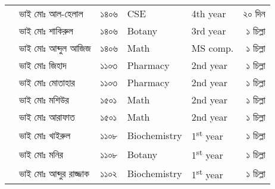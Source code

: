 \documentclass{article}
\newcounter{magicrownumbers}
\newcommand\rownumber{\stepcounter{magicrownumbers}\arabic{magicrownumbers}}
\begin{document}
\begin{tabular}{@{}lll
>{\selectlanguage{english}}l
>{\selectlanguage{english}}l
    r@{}}
\rownumber & ভাই মোঃ আল-হেলাল & ১৪০৬ & CSE & 4th year & ২০ দিন\\
\rownumber & ভাই মোঃ শাকিরুল & ১৪০৬ & Botany & 3rd year & ১ চিল্লা\\ 
\rownumber & ভাই মোঃ আব্দুল আজিজ & ১৪০৬ & Math & MS comp. & ১ চিল্লা\\  
\rownumber & ভাই মোঃ জিহাদ & ১১০৩ & Pharmacy & 2nd year & ১ চিল্লা\\ 
\rownumber & ভাই মোঃ মোতাহার & ১১০৩ & Pharmacy & 2nd year & ১ চিল্লা\\ 
\rownumber & ভাই মোঃ মশিউর & ১৫০১ & Math & 2nd year & ১ চিল্লা\\ 
\rownumber & ভাই মোঃ আরাফাত & ১৫০১ & Math & 2nd year & ১ চিল্লা\\
\rownumber & ভাই মোঃ খাইরুল & ১১০৮ & Biochemistry & 1\textsuperscript{st} year & ১ চিল্লা\\
\rownumber & ভাই মোঃ মনির  & ১১০৮ & Botany & 1\textsuperscript{st} year & ১ চিল্লা\\
\rownumber & ভাই মোঃ আব্দুর রাজ্জাক  & ১১০২ & Biochemistry & 1\textsuperscript{st} year & ১ চিল্লা \\
\bottomrule
\end{tabular}
\end{document}
